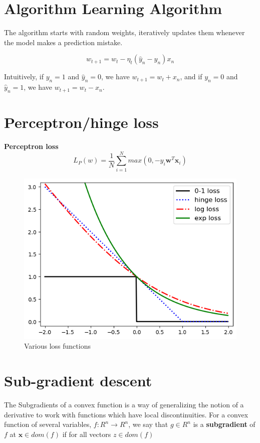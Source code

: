 \documentclass[8pt,letterpaper]{book}
\begin{document}
\section{Algorithm Learning Algorithm}
The algorithm starts with random weights, iteratively updates them whenever the 
model makes a prediction mistake.

$$w_{t+1} = w_t - \eta_t (\hat{y}_n - y_n)x_n$$

Intuitively, if $y_n = 1$ and $\hat{y}_n = 0$, we have $w_{t+1} = w_t + x_n$, 
and if $y_n = 0$ and $\hat{y}_n = 1$, we have $w_{t+1} = w_t - x_n$.

\section{Perceptron/hinge loss}
\textbf{Perceptron loss}
$$L_P(w) = \frac{1}{N} \sum_{i=1}^{N} max(0,-y_i \mathbf{w}^T \mathbf{x}_i)$$

\begin{figure}[H]
    \centering
    \includegraphics[scale=0.5]{losses.png} \par
    \caption{Various loss functions}
    \label{loss_functions}
\end{figure}

\section{Sub-gradient descent}
The Subgradients of a convex function is a way of generalizing the notion of a 
derivative to work with functions which have local discontinuities. For a convex 
function of several variables, $f : R^n \rightarrow R^n$, we say that 
$g \in R^n$ is a \textbf{subgradient} of $f$ at $\mathbf{x} \in dom(f)$ if for 
all vectors $z \in dom(f)$
\end{document}
